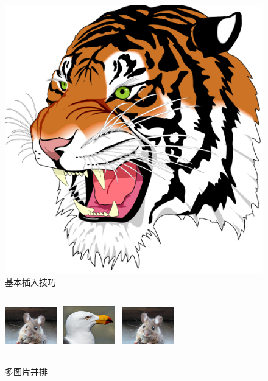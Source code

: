 \documentclass[fancyhdr,adobefonts,oneside,hyperref,openany,a4paper,UTF8]{ctexbook}
\begin{document}
\begin{figure}[htp]
  \centering
    \includegraphics[scale=0.25]{img/tiger}
    \caption{基本插入技巧}
    \label{fig:tiger}
\end{figure}

\begin{figure}[htp]
  \centering
    \includegraphics[width=0.2\textwidth,height=2.5cm]{img/mouse}~
    \includegraphics[width=0.2\textwidth,height=2.5cm]{img/gull}~
    \includegraphics[width=0.2\textwidth,height=2.5cm]{img/mouse}
    \caption{多图片并排}
    \label{fig:tiger}
\end{figure}
\end{document}
